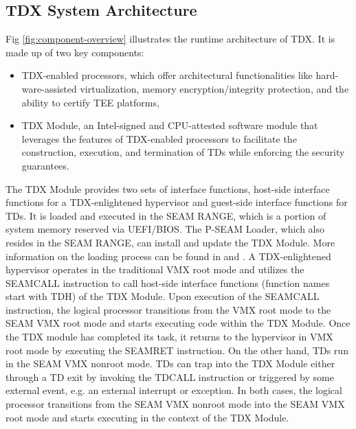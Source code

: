 \subsection{TDX System Architecture}
Fig \ref{fig:component-overview} illustrates the runtime architecture of TDX. It is made up of two key components: 
\begin{itemize}
    \item TDX-enabled processors, which offer architectural functionalities like hard-ware-assisted virtualization, memory encryption/integrity protection, and the ability to certify TEE platforms,
    \item TDX Module, an Intel-signed and CPU-attested software module that leverages the features of TDX-enabled processors to facilitate the construction, execution, and termination of TDs while enforcing the security guarantees. 
\end{itemize} The TDX Module provides two sets of interface functions, host-side interface functions for a TDX-enlightened hypervisor and guest-side interface functions for TDs. It is loaded and executed in the SEAM RANGE, which is a portion of system memory reserved via UEFI/BIOS. The P-SEAM Loader, which also resides in the SEAM RANGE, can install and update the TDX Module. More information on the loading process can be found in \cite{noauthor_white_nodate} and \cite{noauthor_tdx-module-10-public-specpdf_nodate}.
A TDX-enlightened hypervisor operates in the traditional VMX root mode and utilizes the SEAMCALL instruction to call host-side interface functions (function names start with TDH) of the TDX Module. Upon execution of the SEAMCALL instruction, the logical processor transitions from the VMX root mode to the SEAM VMX root mode and starts executing code within the TDX Module. Once the TDX module has completed its task, it returns to the hypervisor in VMX root mode by executing the SEAMRET instruction. On the other hand, TDs run in the SEAM VMX nonroot mode. TDs can trap into the TDX Module either through a TD exit by invoking the TDCALL instruction or triggered by some external event, e.g. an external interrupt or exception. In both cases, the logical processor transitions from the SEAM VMX nonroot mode into the SEAM VMX root mode and starts executing in the context of the TDX Module.
